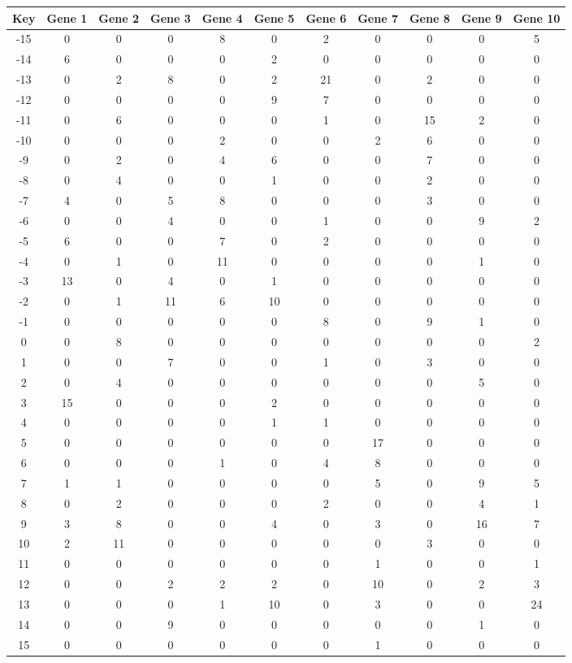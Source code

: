 \begin{tabular}{|c|c|c|c|c|c|c|c|c|c|c|}
\hline
Key & Gene 1 & Gene 2 & Gene 3 & Gene 4 & Gene 5 & Gene 6 & Gene 7 & Gene 8 & Gene 9 & Gene 10 \\
\hline
-15 & 0 & 0 & 0 & 8 & 0 & 2 & 0 & 0 & 0 & 5 \\
-14 & 6 & 0 & 0 & 0 & 2 & 0 & 0 & 0 & 0 & 0 \\
-13 & 0 & 2 & 8 & 0 & 2 & 21 & 0 & 2 & 0 & 0 \\
-12 & 0 & 0 & 0 & 0 & 9 & 7 & 0 & 0 & 0 & 0 \\
-11 & 0 & 6 & 0 & 0 & 0 & 1 & 0 & 15 & 2 & 0 \\
-10 & 0 & 0 & 0 & 2 & 0 & 0 & 2 & 6 & 0 & 0 \\
-9 & 0 & 2 & 0 & 4 & 6 & 0 & 0 & 7 & 0 & 0 \\
-8 & 0 & 4 & 0 & 0 & 1 & 0 & 0 & 2 & 0 & 0 \\
-7 & 4 & 0 & 5 & 8 & 0 & 0 & 0 & 3 & 0 & 0 \\
-6 & 0 & 0 & 4 & 0 & 0 & 1 & 0 & 0 & 9 & 2 \\
-5 & 6 & 0 & 0 & 7 & 0 & 2 & 0 & 0 & 0 & 0 \\
-4 & 0 & 1 & 0 & 11 & 0 & 0 & 0 & 0 & 1 & 0 \\
-3 & 13 & 0 & 4 & 0 & 1 & 0 & 0 & 0 & 0 & 0 \\
-2 & 0 & 1 & 11 & 6 & 10 & 0 & 0 & 0 & 0 & 0 \\
-1 & 0 & 0 & 0 & 0 & 0 & 8 & 0 & 9 & 1 & 0 \\
0 & 0 & 8 & 0 & 0 & 0 & 0 & 0 & 0 & 0 & 2 \\
1 & 0 & 0 & 7 & 0 & 0 & 1 & 0 & 3 & 0 & 0 \\
2 & 0 & 4 & 0 & 0 & 0 & 0 & 0 & 0 & 5 & 0 \\
3 & 15 & 0 & 0 & 0 & 2 & 0 & 0 & 0 & 0 & 0 \\
4 & 0 & 0 & 0 & 0 & 1 & 1 & 0 & 0 & 0 & 0 \\
5 & 0 & 0 & 0 & 0 & 0 & 0 & 17 & 0 & 0 & 0 \\
6 & 0 & 0 & 0 & 1 & 0 & 4 & 8 & 0 & 0 & 0 \\
7 & 1 & 1 & 0 & 0 & 0 & 0 & 5 & 0 & 9 & 5 \\
8 & 0 & 2 & 0 & 0 & 0 & 2 & 0 & 0 & 4 & 1 \\
9 & 3 & 8 & 0 & 0 & 4 & 0 & 3 & 0 & 16 & 7 \\
10 & 2 & 11 & 0 & 0 & 0 & 0 & 0 & 3 & 0 & 0 \\
11 & 0 & 0 & 0 & 0 & 0 & 0 & 1 & 0 & 0 & 1 \\
12 & 0 & 0 & 2 & 2 & 2 & 0 & 10 & 0 & 2 & 3 \\
13 & 0 & 0 & 0 & 1 & 10 & 0 & 3 & 0 & 0 & 24 \\
14 & 0 & 0 & 9 & 0 & 0 & 0 & 0 & 0 & 1 & 0 \\
15 & 0 & 0 & 0 & 0 & 0 & 0 & 1 & 0 & 0 & 0 \\
\hline
\end{tabular}